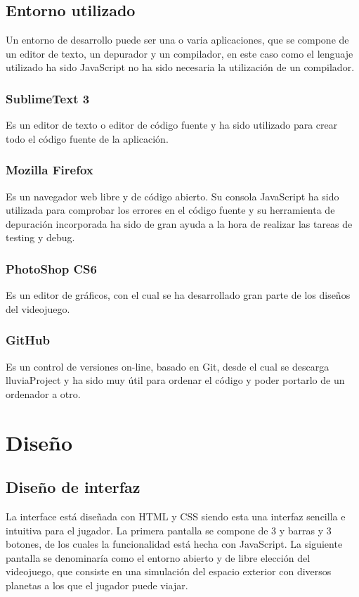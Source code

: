 \documentclass[a4paper,10pt]{article}
\begin{document}
\subsection{Entorno utilizado}
Un entorno de desarrollo puede ser una o varia aplicaciones, 
que se compone de un editor de texto, un depurador y un compilador, 
en este caso como el lenguaje utilizado ha sido JavaScript no ha sido 
necesaria la utilización de un compilador.

\subsubsection{SublimeText 3}
Es un editor de texto o editor de código fuente y 
ha sido utilizado para crear todo el código fuente de la aplicación.

\subsubsection{Mozilla Firefox}
Es un navegador web libre y de código abierto. 
Su consola JavaScript ha sido utilizada para comprobar los 
errores en el código fuente y su herramienta de depuración 
incorporada ha sido de gran ayuda a la hora de realizar las tareas de 
testing y debug.

\subsubsection{PhotoShop CS6}
Es un editor de gráficos, con el cual se ha desarrollado 
gran parte de los diseños del videojuego.

\subsubsection{GitHub}
Es un control de versiones on-line, basado en Git, 
desde el cual se descarga lluviaProject y ha sido muy útil 
para ordenar el código y poder portarlo de un ordenador a otro.
\cleardoublepage

\section{Diseño}
\subsection{Diseño de interfaz}
La interface está diseñada con HTML y CSS siendo esta una interfaz 
sencilla e intuitiva para el jugador.
La primera pantalla se compone de 3 y barras y 3 botones, de 
los cuales la funcionalidad está hecha con JavaScript.
La siguiente pantalla se denominaría como el entorno abierto y 
de libre elección del videojuego, que consiste en una simulación del 
espacio exterior con diversos planetas a los que el jugador puede viajar.
\end{document}
